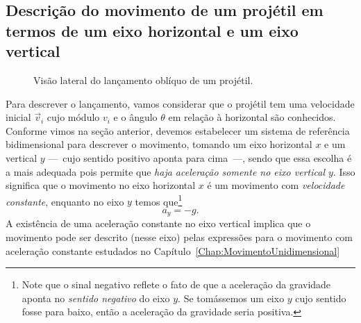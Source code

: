 \subsection{Descrição do movimento de um projétil em termos de um eixo horizontal e um eixo vertical}

\begin{figure}[ht]\forcerectofloat
\centering
{}
\caption{Visão lateral do lançamento oblíquo de um projétil.}
\end{figure}

Para descrever o lançamento, vamos considerar que o projétil tem uma velocidade inicial $\vec{v}_i$ cujo módulo $v_i$ e o ângulo $\theta$ em relação à horizontal são conhecidos. Conforme vimos na seção anterior, devemos estabelecer um sistema de referência bidimensional para descrever o movimento, tomando um eixo horizontal $x$ e um vertical $y$ ---~cujo sentido positivo aponta para cima~---, sendo que essa escolha é a mais adequada pois permite que \emph{haja aceleração somente no eixo vertical $y$}. Isso significa que o movimento no eixo horizontal $x$ é um movimento com \emph{velocidade constante}, enquanto no eixo $y$ temos que\footnote{Note que o sinal negativo reflete o fato de que a aceleração da gravidade aponta no \emph{sentido negativo} do eixo $y$. Se tomássemos um eixo $y$ cujo sentido fosse para baixo, então a aceleração da gravidade seria positiva.}
\begin{equation}
	a_y = -g.
\end{equation}
%
A existência de uma aceleração constante no eixo vertical implica que o movimento pode ser descrito (nesse eixo) pelas expressões para o movimento com aceleração constante estudados no Capítulo~\ref{Chap:MovimentoUnidimensional}

